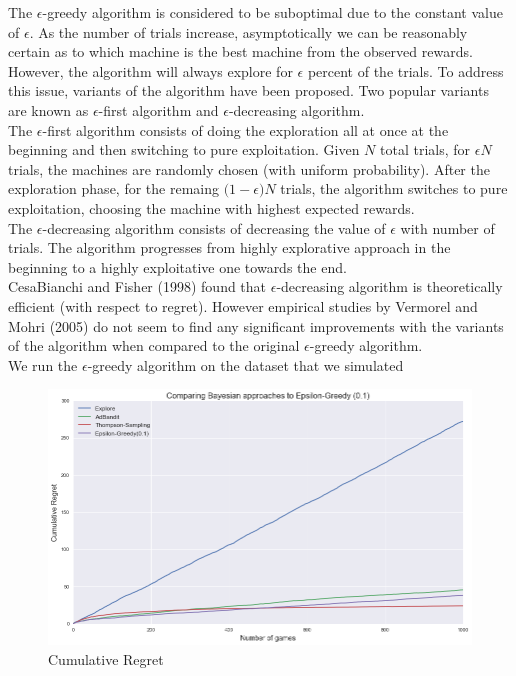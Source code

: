 \documentclass{article}
\begin{document}
The $\epsilon$-greedy algorithm is considered to be suboptimal due to the constant value of $\epsilon$. As the number of trials increase, asymptotically we can be reasonably certain as to which machine is the best machine from the observed rewards. However, the algorithm will always explore for $\epsilon$ percent of the trials. To address this issue, variants of the algorithm have been proposed. Two popular variants are known as $\epsilon$-first algorithm and $\epsilon$-decreasing algorithm.\\

The $\epsilon$-first algorithm consists of doing the exploration all at once at the beginning and then switching to pure exploitation. Given $N$ total trials, for $\epsilon N$ trials, the machines are randomly chosen (with uniform probability). After the exploration phase, for the remaing $\big( 1-\epsilon \big) N$ trials, the algorithm switches to pure exploitation, choosing the machine with highest expected rewards.\\

The $\epsilon$-decreasing algorithm consists of decreasing the value of $\epsilon$ with number of trials. The algorithm progresses from highly explorative approach in the beginning to a highly exploitative one towards the end.\\

CesaBianchi and Fisher (1998) found that $\epsilon$-decreasing algorithm is theoretically efficient (with respect to regret). However empirical studies by Vermorel and Mohri (2005) do not seem to find any significant improvements with the variants of the algorithm when compared to the original $\epsilon$-greedy algorithm.\\

We run the  $\epsilon$-greedy algorithm on the dataset that we simulated

\begin{figure}[H]
\centering
\includegraphics[scale=0.4]{eps_greedy.png}
\caption{Cumulative Regret}
\end{figure}
\end{document}
